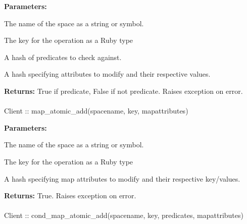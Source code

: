 \noindent\textbf{Parameters:}
\begin{description}[labelindent=\widthof{{\code{predicates}}},leftmargin=*,noitemsep,nolistsep,align=right]
\item[\code{spacename}] The name of the space as a string or symbol.
\item[\code{key}] The key for the operation as a Ruby type
\item[\code{predicates}] A hash of predicates to check against.
\item[\code{attributes}] A hash specifying attributes to modify and their respective values.
\end{description}

\noindent\textbf{Returns:}
True if predicate, False if not predicate.  Raises exception on error.

\paragraph{}
\label{api:ruby:map_atomic_add}
\begin{rubycode}
Client :: map_atomic_add(spacename, key, mapattributes)
\end{rubycode}


\noindent\textbf{Parameters:}
\begin{description}[labelindent=\widthof{{\code{mapattributes}}},leftmargin=*,noitemsep,nolistsep,align=right]
\item[\code{spacename}] The name of the space as a string or symbol.
\item[\code{key}] The key for the operation as a Ruby type
\item[\code{mapattributes}] A hash specifying map attributes to modify and their respective key/values.
\end{description}

\noindent\textbf{Returns:}
True.  Raises exception on error.

\paragraph{}
\label{api:ruby:cond_map_atomic_add}
\begin{rubycode}
Client :: cond_map_atomic_add(spacename, key, predicates, mapattributes)
\end{rubycode}


